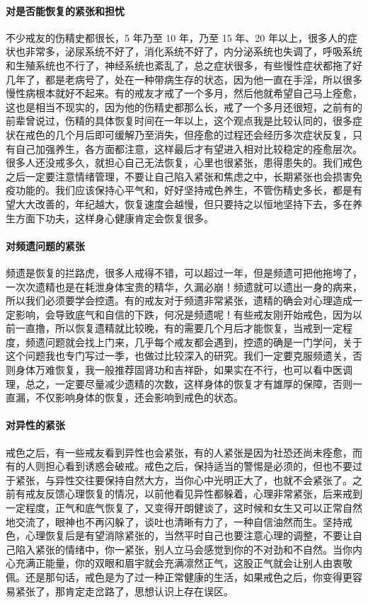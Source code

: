 \paragraph{对是否能恢复的紧张和担忧}

不少戒友的伤精史都很长，5 年乃至 10 年，乃至 15 年、20 年以上，很多人的症状也非常多，泌尿系统不好了，消化系统不好了，内分泌系统也失调了，呼吸系统和生殖系统也不行了，神经系统也紊乱了，总之症状很多，有些慢性症状都拖了好几年了，都是老病号了，处在一种带病生存的状态，因为他一直在手淫，所以很多慢性病根本就好不起来。有的戒友才戒了一个多月，然后他就希望自己马上痊愈，这也是相当不现实的，因为他的伤精史都那么长，戒了一个多月还很短，之前有的前辈曾说过，伤精的具体恢复时间在一年以上，这个观点我是比较认同的，很多症状在戒色的几个月后即可缓解乃至消失，但痊愈的过程还会经历多次症状反复，只有自己加强养生，各方面都注意，这样最后才有望进入相对比较稳定的痊愈层次。很多人还没戒多久，就担心自己无法恢复，心里也很紧张，患得患失的。我们戒色之后一定要注意情绪管理，不要让自己陷入紧张和焦虑之中，长期紧张也会损害免疫功能的。我们应该保持心平气和，好好坚持戒色养生，不管伤精史多长，都是有望大大改善的，年纪越大，恢复速度会越慢，但只要持之以恒地坚持下去，多在养生方面下功夫，这样身心健康肯定会恢复很多。

\paragraph{对频遗问题的紧张}

频遗是恢复的拦路虎，很多人戒得不错，可以超过一年，但是频遗可把他拖垮了，一次次遗精也是在耗泄身体宝贵的精华，久漏必崩！频遗就可以遗出一身的病来，所以我们必须要学会控遗。有的戒友对于频遗非常紧张，遗精的确会对心理造成一定影响，会导致底气和自信的下跌，何况是频遗呢！有些戒友刚开始戒色，因为以前一直撸，所以恢复遗精就比较晚，有的需要几个月后才能恢复，当戒到一定程度，频遗问题就会找上门来，几乎每个戒友都会遇到，控遗的确是一门学问，关于这个问题我也专门写过一季，也做过比较深入的研究。我们一定要克服频遗关，否则身体万难恢复，我一般推荐固肾功和吉祥卧，如果实在不行，也可以看中医调理，总之，一定要尽量减少遗精的次数，这样身体的恢复才有雄厚的保障，否则一直漏，不仅影响身体的恢复，还会影响到戒色的状态。

\paragraph{对异性的紧张}

戒色之后，有一些戒友看到异性也会紧张，有的人紧张是因为社恐还尚未痊愈，而有的人则担心看到诱惑会破戒。戒色之后，保持适当的警惕是必须的，但也不要过于紧张，与异性交往要保持自然大方，当你心中光明正大了，也就不会紧张了。之前有戒友反馈心理恢复的情况，以前他看见异性都躲着，心理非常紧张，后来戒到一定程度，正气和底气恢复了，又变得开朗健谈了，这时候和女生又可以正常自然地交流了，眼神也不再闪躲了，谈吐也清晰有力了，一种自信油然而生。坚持戒色，心理恢复后是有望消除紧张的，当然平时自己也要注意心理的调整，不要让自己陷入紧张的情绪中，你一紧张，别人立马会感觉到你的不对劲和不自然。当你内心充满正能量，你的双眼和眉宇就会充满凛然正气，这股正气就会让别人由衷敬佩。还是那句话，戒色是为了过一种正常健康的生活，如果戒色之后，你变得更容易紧张了，那肯定走岔路了，思想认识上存在误区。

